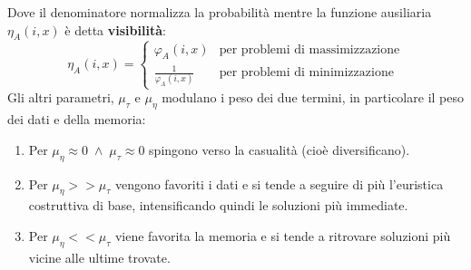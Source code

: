 \documentclass[\main/main.tex]{subfiles}
\begin{document}
\begin{multicols}{2}
\begin{observation}
\[    \]
    Dove il denominatore normalizza la probabilità mentre la funzione ausiliaria \(\eta_A(i,x)\) è detta \textbf{visibilità}:
    \[
        \eta_A(i,x) = \begin{cases}
            \varphi_A(i, x) & \text{per problemi di massimizzazione}\\
            \frac{1}{\varphi_A(i, x)} & \text{per problemi di minimizzazione}
        \end{cases}
    \]
    Gli altri parametri, \(\mu_\tau\) e \(\mu_\eta\) modulano i peso dei due termini, in particolare il peso dei dati e della memoria:
    \begin{enumerate}
        \item Per \(\mu_\eta \approx 0\;\land\;\mu_\tau \approx 0\) spingono verso la casualità (cioè diversificano).
        \item Per \(\mu_\eta >> \mu_\tau\) vengono favoriti i dati e si tende a seguire di più l'euristica costruttiva di base, intensificando quindi le soluzioni più immediate.
        \item Per \(\mu_\eta << \mu_\tau\) viene favorita la memoria e si tende a ritrovare soluzioni più vicine alle ultime trovate.
    \end{enumerate}
\end{observation}
\end{multicols}
\clearpage
\end{document}
